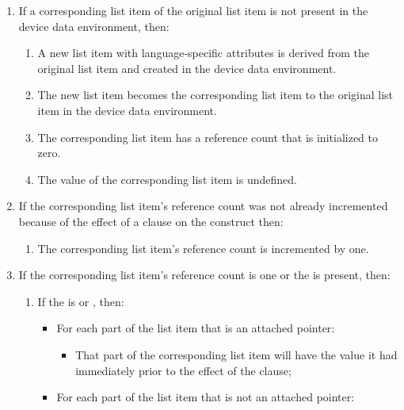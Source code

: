 \begin{enumerate}
\item If a corresponding list item of the original list item is not present in the device data environment, then:
\begin{enumerate}
\item A new list item with language-specific attributes is derived from the original list item and created in the device data environment.
\item The new list item becomes the corresponding list item to the original list item in the device data environment.
\item The corresponding list item has a reference count that is initialized to zero.
\item The value of the corresponding list item is undefined.
\end{enumerate}

\item If the corresponding list item's reference count was not already
incremented because of the effect of a  clause on the
construct then:
\begin{enumerate}
\item The corresponding list item's reference count is incremented by one.
\end{enumerate}

\item If the corresponding list item's reference count is one or the   is present, then:
\begin{enumerate}
\item If the  is  or , then:
    \begin{itemize}

    \item For each part of the list item that is an attached pointer:  \begin{itemize}

        \item That part of the corresponding list item will
        have the value it had immediately prior to the effect of the  clause;

   \end{itemize}

    \item For each part of the list item that is not an attached pointer: \begin{itemize}


\end{itemize}
\end{itemize}
\end{enumerate}
\end{enumerate}
